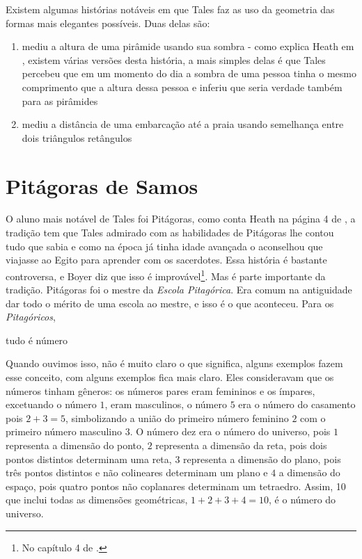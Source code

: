 \documentclass{article}
\begin{document}
Existem algumas histórias notáveis em que Tales faz as uso da geometria
das formas mais elegantes possíveis. Duas delas são:
\begin{enumerate}
	\item mediu a altura de uma pirâmide usando sua sombra - como explica Heath em
		\cite{Heath}, existem várias versões desta história,
		a mais simples delas é que Tales percebeu que em um momento
		do dia a sombra de uma pessoa tinha o mesmo comprimento que
		a altura dessa pessoa e inferiu que seria verdade também para
		as pirâmides
	\item mediu a distância de uma embarcação até a praia usando semelhança
		entre dois triângulos retângulos
\end{enumerate}


\section{Pitágoras de Samos}

O aluno mais notável de Tales foi Pitágoras, como conta Heath na página 4 de \cite{Heath}, a tradição tem que Tales admirado com as habilidades de Pitágoras lhe contou tudo
que sabia e como na época já tinha idade avançada o aconselhou que viajasse ao
Egito para aprender com os sacerdotes. Essa história é bastante controversa, e
Boyer diz que isso é improvável\footnote{No capítulo 4 de \cite{Boyer}.}. Mas 
é parte importante da tradição.
Pitágoras foi o mestre da \emph{Escola Pitagórica}. Era comum na antiguidade
dar todo o mérito de uma escola ao mestre, e isso é o que aconteceu. Para os
\emph{Pitagóricos},

\begin{center}
\begin{framed}
	tudo é número
\end{framed}
\end{center}

Quando ouvimos isso, não é muito claro o que significa, alguns exemplos
fazem esse conceito, com alguns exemplos fica mais claro. Eles consideravam que os números 
tinham gêneros: os números pares eram femininos e os ímpares, excetuando o número
$1$, eram masculinos, 
o número $5$ era o número do casamento pois $2 + 3 = 5$, 
simbolizando a união do primeiro número feminino $2$ com o 
primeiro número masculino $3$. 
O número dez era o número do universo, pois 
$1$ representa a dimensão do ponto, 
$2$ representa a dimensão da reta, pois dois pontos distintos determinam uma reta, 
$3$ representa a dimensão do plano, pois três pontos distintos e não colineares determinam um plano e 
$4$ a dimensão do espaço, pois quatro pontos não coplanares determinam um tetraedro.
Assim, 10 que inclui todas as dimensões geométricas, $1 + 2 + 3 + 4 = 10$, 
é o número do universo.
\end{document}
